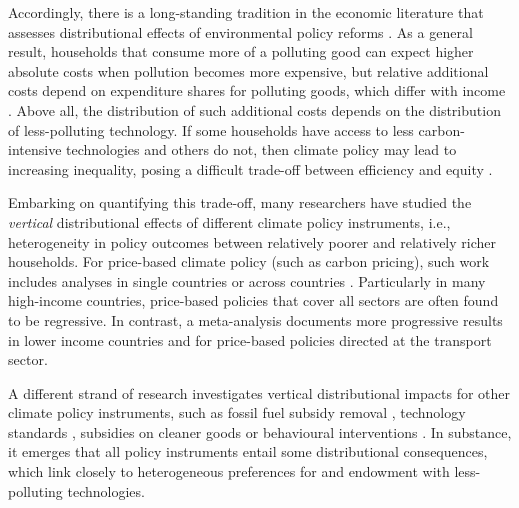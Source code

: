 \documentclass[12pt, a4paper]{article}
\begin{document}
Accordingly, there is a long-standing tradition in the economic literature that assesses distributional effects of environmental policy reforms \autocite{Cremer.2003,Poterba.1991,Sandmo.1975,Stiglitz.2019}. As a general result, households that consume more of a polluting good can expect higher absolute costs when pollution becomes more expensive, but relative additional costs depend on expenditure shares for polluting goods, which differ with income \autocite{Jacobs.2019,Dorband.2019}. Above all, the distribution of such additional costs depends on the distribution of less-polluting technology. If some households have access to less carbon-intensive technologies and others do not, then climate policy may lead to increasing inequality, posing a difficult trade-off between efficiency and equity \autocite{Hansel.2022,TerryDinan.2016}. 

Embarking on quantifying this trade-off, many researchers have studied the \textit{vertical} distributional effects of different climate policy instruments, i.e., heterogeneity in policy outcomes between relatively poorer and relatively richer households. For price-based climate policy (such as carbon pricing), such work includes analyses in single countries \autocite{Goulder.2019,Grainger.2010,Rausch.2011,Garaffa.2021,Sterner.2012,Wu.2022} or across countries \autocite{Budolfson.2021,Feindt.2021,Dorband.2019,Steckel.2021b,VogtSchilb.2019,Missbach.2024}. Particularly in many high-income countries, price-based policies that cover all sectors are often found to be regressive. In contrast, a meta-analysis \autocite{Ohlendorf.2021} documents more progressive results in lower income countries and for price-based policies directed at the transport sector.

A different strand of research investigates vertical distributional impacts for other climate policy instruments, such as fossil fuel subsidy removal \autocite{Schaffitzel.2019,Giuliano.2020,DelArzeGranado.2012}, technology standards \autocite{Levinson.2019,Zhao.2022,Bruegge.2019}, subsidies on cleaner goods \autocite{Borenstein.2016,Vaishnav.2017,Winter.2019} or behavioural interventions \autocite{DellaValle.2020,Liebe.2021}. In substance, it emerges that all policy instruments entail some distributional consequences, which link closely to heterogeneous preferences for and endowment with less-polluting technologies. 
\end{document}
